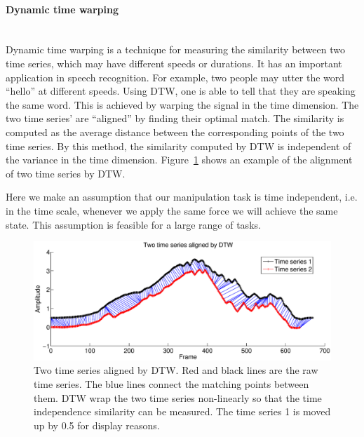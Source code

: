\paragraph{Dynamic time warping} ~\\
Dynamic time warping is a technique for measuring the similarity between two time series, which may have different speeds or durations. It has an important application in speech recognition. For example, two people may utter the word ``hello'' at different speeds. Using DTW, one is able to tell that they are speaking the same word. This is achieved by warping the signal in the time dimension. The two time series' are ``aligned'' by finding their optimal match. The similarity is computed as the average distance between the corresponding points of the two time series. By this method, the similarity computed by DTW is independent of the variance in the time dimension. Figure~\ref{fig:alignDTW} shows an example of the alignment of two time series by DTW.

Here we make an assumption that our manipulation task is time independent, i.e. in the time scale, whenever we apply the same force we will achieve the same state. This assumption is feasible for a large range of tasks.

\begin{figure}
  \centering
  \hspace{-2cm}
  \includegraphics[width=16cm]{./fig_cha4/alignDTW.eps}
  \caption{   {Two time series aligned by DTW. Red and black lines are the raw time series. The blue lines connect the matching points between them. DTW wrap the two time series non-linearly so that the time independence similarity can be measured. The time series 1 is moved up by 0.5 for display reasons.}
}
\label{fig:alignDTW}
\end{figure}



